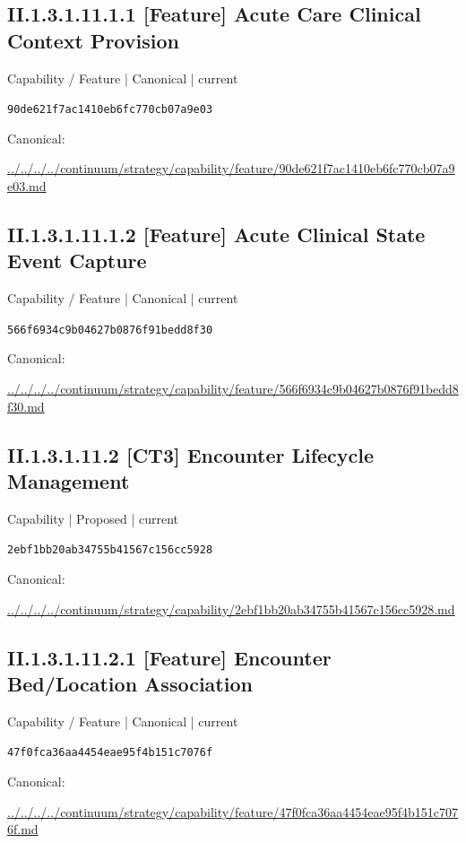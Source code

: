 \documentclass[10pt,a4paper]{article}
\begin{document}
\subsection*{II.1.3.1.11.1.1 [Feature] Acute Care Clinical Context Provision}
\label{element-90de621f7ac1410eb6fc770cb07a9e03}
{\small Capability / Feature | Canonical | current}\par
\texttt{90de621f7ac1410eb6fc770cb07a9e03}\par
Canonical: \par
{\footnotesize\url{../../../../continuum/strategy/capability/feature/90de621f7ac1410eb6fc770cb07a9e03.md}}\par
\subsection*{II.1.3.1.11.1.2 [Feature] Acute Clinical State Event Capture}
\label{element-566f6934c9b04627b0876f91bedd8f30}
{\small Capability / Feature | Canonical | current}\par
\texttt{566f6934c9b04627b0876f91bedd8f30}\par
Canonical: \par
{\footnotesize\url{../../../../continuum/strategy/capability/feature/566f6934c9b04627b0876f91bedd8f30.md}}\par
\subsection*{II.1.3.1.11.2 [CT3] Encounter Lifecycle Management}
\label{element-2ebf1bb20ab34755b41567c156cc5928}
{\small Capability | Proposed | current}\par
\texttt{2ebf1bb20ab34755b41567c156cc5928}\par
Canonical: \par
{\footnotesize\url{../../../../continuum/strategy/capability/2ebf1bb20ab34755b41567c156cc5928.md}}\par
\subsection*{II.1.3.1.11.2.1 [Feature] Encounter Bed/Location Association}
\label{element-47f0fca36aa4454eae95f4b151c7076f}
{\small Capability / Feature | Canonical | current}\par
\texttt{47f0fca36aa4454eae95f4b151c7076f}\par
Canonical: \par
{\footnotesize\url{../../../../continuum/strategy/capability/feature/47f0fca36aa4454eae95f4b151c7076f.md}}\par
\end{document}
